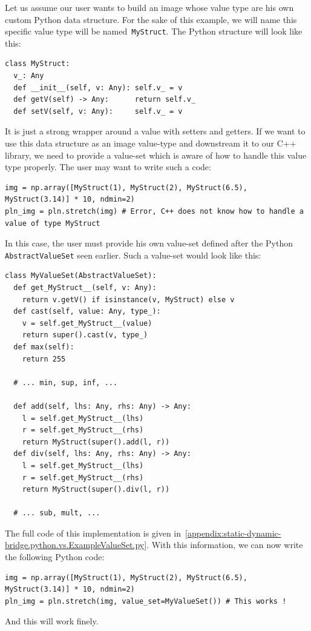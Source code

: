 Let us assume our user wants to build an image whose value type are his own custom Python data structure. For the sake
of this example, we will name this specific value type will be named~\texttt{MyStruct}. The Python structure will look
like this:
\begin{verbatim}
class MyStruct:
  v_: Any
  def __init__(self, v: Any): self.v_ = v
  def getV(self) -> Any:      return self.v_
  def setV(self, v: Any):     self.v_ = v
\end{verbatim}
It is just a strong wrapper around a value with setters and getters. If we want to use this data structure as an image
value-type and downstream it to our C++ library, we need to provide a value-set which is aware of how to handle this
value type properly. The user may want to write such a code:
\begin{verbatim}
img = np.array([MyStruct(1), MyStruct(2), MyStruct(6.5), MyStruct(3.14)] * 10, ndmin=2)
pln_img = pln.stretch(img) # Error, C++ does not know how to handle a value of type MyStruct
\end{verbatim}
In this case, the user must provide his own value-set defined after the Python \texttt{AbstractValueSet} seen earlier.
Such a value-set would look like this:
\begin{verbatim}
class MyValueSet(AbstractValueSet):
  def get_MyStruct__(self, v: Any):
    return v.getV() if isinstance(v, MyStruct) else v
  def cast(self, value: Any, type_):
    v = self.get_MyStruct__(value)
    return super().cast(v, type_)
  def max(self):
    return 255

  # ... min, sup, inf, ...

  def add(self, lhs: Any, rhs: Any) -> Any:
    l = self.get_MyStruct__(lhs)
    r = self.get_MyStruct__(rhs)
    return MyStruct(super().add(l, r))
  def div(self, lhs: Any, rhs: Any) -> Any:
    l = self.get_MyStruct__(lhs)
    r = self.get_MyStruct__(rhs)
    return MyStruct(super().div(l, r))

  # ... sub, mult, ...
\end{verbatim}
The full code of this implementation is given in~\cref{appendix:static-dynamic-bridge.python.vs.ExampleValueSet.py}.
With this information, we can now write the following Python code:
\begin{verbatim}
img = np.array([MyStruct(1), MyStruct(2), MyStruct(6.5), MyStruct(3.14)] * 10, ndmin=2)
pln_img = pln.stretch(img, value_set=MyValueSet()) # This works !
\end{verbatim}
And this will work finely.

